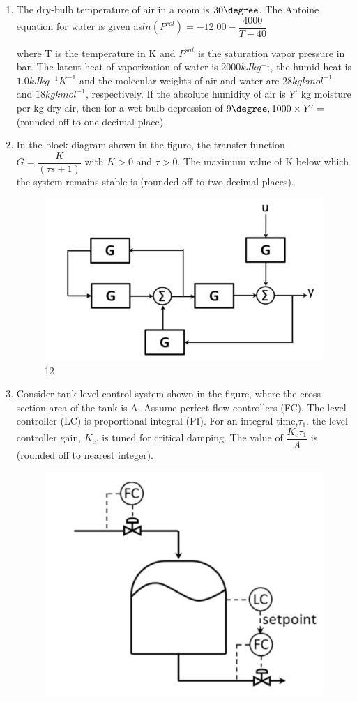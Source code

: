 \documentclass[journal]{IEEEtran}
\numberwithin{equation}{enumi}
\numberwithin{figure}{enumi}
\begin{document}
\begin{enumerate}[start=1, label={Q\arabic*.}]
\vspace{0.2cm}
\item The dry-bulb temperature of air in a room is $30\degree$. The Antoine equation for water is given as$ln(P ^ {rol}) = -12.00 - \dfrac{4000}{T-40}$

where T is the temperature in K and $P^{sat} $ is the saturation vapor pressure in bar. The latent heat of vaporization of water is $2000 kJ kg^{-1} $, the humid heat is $1.0 kJ kg^{-1} K^{-1} $ and the molecular weights of air and water are $28 kg kmol^{-1}$ and $18 kg kmol^{-1}$, respectively. If the absolute humidity of air is $Y'$ kg moisture per kg dry air, then for a wet-bulb depression of $9\degree, 1000 \times Y' =$ \underline{\hspace{1.5cm}} (rounded off to one decimal place).
\item In the block diagram shown in the figure, the transfer function $G=\dfrac{K}{(\tau s+1)}$ with $K>0$ and $\tau >0$. The maximum value of K below which the system remains stable is \underline{\hspace{1.5cm}} (rounded off to two decimal places).
\begin{figure}[H]
    \centering
    \includegraphics[width=0.3\linewidth]{figs/fig12.jpeg}
    \caption{12}
    \label{fig:12}
\end{figure}
\item Consider tank level control system shown in the figure, where the cross-section area of the tank is A. Assume perfect flow controllers (FC). The level controller (LC) is proportional-integral (PI). For an integral time,$\tau_1$. the level controller gain, $K_c$, is tuned for critical damping. The value of $\dfrac{K_c \tau_1}{A}$ is \underline{\hspace{1.5cm}} (rounded off to nearest integer).
\begin{figure}[H]
    \centering
    \includegraphics[width=0.3\linewidth]{figs/fig13.jpeg}

\end{figure}
\end{enumerate}
\end{document}
